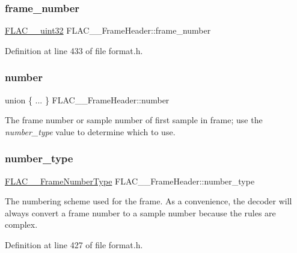 \subsubsection{\texorpdfstring{frame\_number}{frame\_number}}
{\footnotesize\ttfamily \mbox{\hyperlink{ordinals_8h_a9c4005ea7ef8d564b0cc993cdd0e4e5e}{F\+L\+A\+C\+\_\+\+\_\+uint32}} F\+L\+A\+C\+\_\+\+\_\+\+Frame\+Header\+::frame\+\_\+number}



Definition at line 433 of file format.\+h.

\mbox{\label{struct_f_l_a_c_____frame_header_a85ad2b5f95c12338fa312a82b456a918}} 
\subsubsection{\texorpdfstring{number}{number}}
{\footnotesize\ttfamily union \{ ... \}   F\+L\+A\+C\+\_\+\+\_\+\+Frame\+Header\+::number}

The frame number or sample number of first sample in frame; use the {\itshape number\+\_\+type} value to determine which to use. \mbox{\label{struct_f_l_a_c_____frame_header_a7a62ec09e6f3029297179ef65377265f}} 
\subsubsection{\texorpdfstring{number\_type}{number\_type}}
{\footnotesize\ttfamily \mbox{\hyperlink{group__flac__format_ga8fe9ebc78386cd2a3d23b7b8e3818e1c}{F\+L\+A\+C\+\_\+\+\_\+\+Frame\+Number\+Type}} F\+L\+A\+C\+\_\+\+\_\+\+Frame\+Header\+::number\+\_\+type}

The numbering scheme used for the frame. As a convenience, the decoder will always convert a frame number to a sample number because the rules are complex. 

Definition at line 427 of file format.\+h.

\mbox{\label{struct_f_l_a_c_____frame_header_a4bbe555be68bd9fa48a22624233ee9f0}} 
